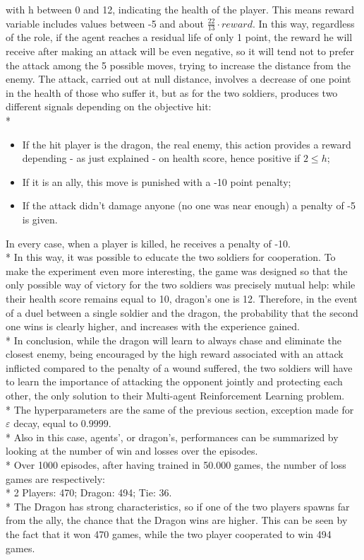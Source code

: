 with h between 0 and 12, indicating the health of the player. This means reward variable includes values between -5 and about $\frac{22}{13}\cdot reward$. In this way, regardless of the role, if the agent reaches a residual life of only 1 point, the reward he will receive after making an attack will be even negative, so it will tend not to prefer the attack among the 5 possible moves, trying to increase the distance from the enemy. The attack, carried out at null distance, involves a decrease of one point in the health of those who suffer it, but as for the two soldiers, produces two different signals depending on the objective hit:\\*
\begin{itemize}[noitemsep, topsep=0ex]
  \item If the hit player is the dragon, the real enemy, this action provides a reward depending - as just explained - on health score, hence positive if $2\leq h$;
  \item If it is an ally, this move is punished with a -10 point penalty;
  \item If the attack didn't damage anyone (no one was near enough) a penalty of -5 is given.
\end{itemize}
In every case, when a player is killed, he receives a penalty of -10.\\*
In this way, it was possible to educate the two soldiers for cooperation. To make the experiment even more interesting, the game was designed so that the only possible way of victory for the two soldiers was precisely mutual help: while their health score remains equal to 10, dragon's one is 12. Therefore, in the event of a duel between a single soldier and the dragon, the probability that the second one wins is clearly higher, and increases with the experience gained.\\*
In conclusion, while the dragon will learn to always chase and eliminate the closest enemy, being encouraged by the high reward associated with an attack inflicted compared to the penalty of a wound suffered, the two soldiers will have to learn the importance of attacking the opponent jointly and protecting each other, the only solution to their Multi-agent Reinforcement Learning problem.\\*
The hyperparameters are the same of the previous section, exception made for $\varepsilon$ decay, equal to $0.9999$.\\*
Also in this case, agents', or dragon's, performances can be summarized by looking at the number of win and losses over the episodes.\\*
Over 1000 episodes, after having trained in 50.000 games, the number of loss games are respectively:\\*
2 Players: 470; Dragon: 494; Tie: 36.\\*
The Dragon has strong characteristics, so if one of the two players spawns far from the ally, the chance that the Dragon wins are higher. This can be seen by the fact that it won 470 games, while the two player cooperated to win 494 games.

